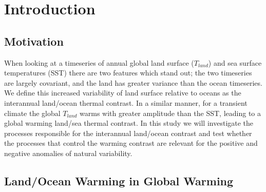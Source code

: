 \chapter{Introduction} %

\label{introduction} %



\section{Motivation}

When looking at a timeseries of annual global land surface ($T_{land}$) and sea 
surface temperatures (SST) there are two features which stand out; the two 
timeseries are largely covariant, and the land has greater variance than the 
ocean timeseries.  We define this increased variability of land surface relative 
to oceans as the interannual land/ocean thermal contrast. In a similar manner, 
for a transient climate the global $T_{land}$ warms with greater amplitude than 
the SST, leading to a global warming land/sea thermal contrast. In this study we 
will investigate the processes responsible for the interannual land/ocean 
contrast and test whether the processes that control the warming contrast are 
relevant for the positive and negative anomalies of natural variability.

\section{Land/Ocean Warming in Global Warming}

